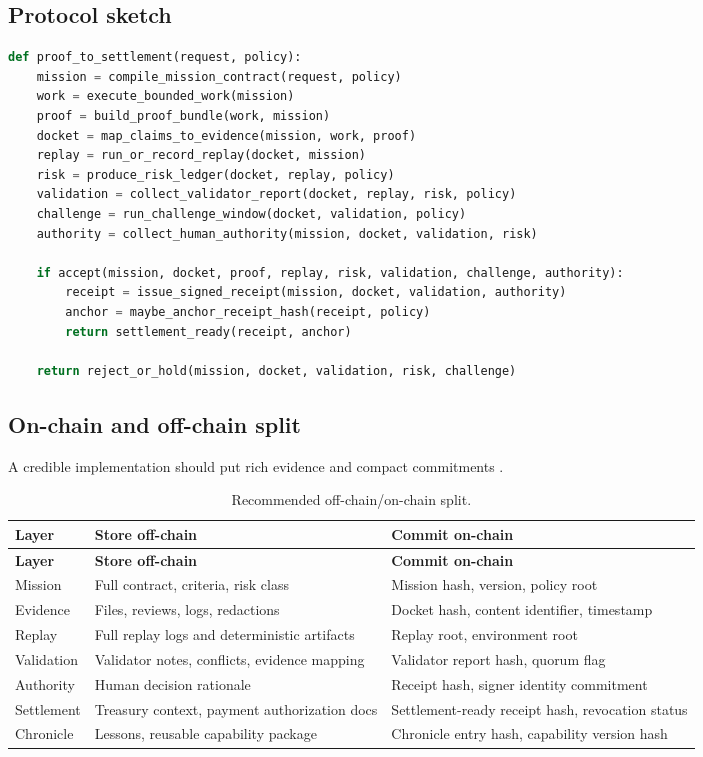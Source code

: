 \subsection{Protocol sketch}

\begin{lstlisting}[language=Python, caption={GoalOS proof-to-settlement protocol sketch.}]
def proof_to_settlement(request, policy):
    mission = compile_mission_contract(request, policy)
    work = execute_bounded_work(mission)
    proof = build_proof_bundle(work, mission)
    docket = map_claims_to_evidence(mission, work, proof)
    replay = run_or_record_replay(docket, mission)
    risk = produce_risk_ledger(docket, replay, policy)
    validation = collect_validator_report(docket, replay, risk, policy)
    challenge = run_challenge_window(docket, validation, policy)
    authority = collect_human_authority(mission, docket, validation, risk)

    if accept(mission, docket, proof, replay, risk, validation, challenge, authority):
        receipt = issue_signed_receipt(mission, docket, validation, authority)
        anchor = maybe_anchor_receipt_hash(receipt, policy)
        return settlement_ready(receipt, anchor)

    return reject_or_hold(mission, docket, validation, risk, challenge)
\end{lstlisting}

\subsection{On-chain and off-chain split}

A credible implementation should put rich evidence \offchain{} and compact commitments \onchain{}.

\begin{longtable}{p{} p{} p{}}
\caption{Recommended off-chain/on-chain split.}\label{tab:split}\\
\toprule
\textbf{Layer} & \textbf{Store off-chain} & \textbf{Commit on-chain}\\
\midrule
\endfirsthead
\toprule
\textbf{Layer} & \textbf{Store off-chain} & \textbf{Commit on-chain}\\
\midrule
\endhead
Mission & Full contract, criteria, risk class & Mission hash, version, policy root \\
Evidence & Files, reviews, logs, redactions & Docket hash, content identifier, timestamp \\
Replay & Full replay logs and deterministic artifacts & Replay root, environment root \\
Validation & Validator notes, conflicts, evidence mapping & Validator report hash, quorum flag \\
Authority & Human decision rationale & Receipt hash, signer identity commitment \\
Settlement & Treasury context, payment authorization docs & Settlement-ready receipt hash, revocation status \\
Chronicle & Lessons, reusable capability package & Chronicle entry hash, capability version hash \\
\bottomrule
\end{longtable}

